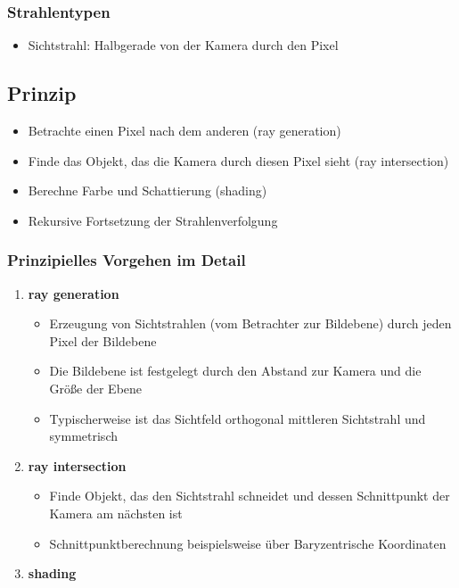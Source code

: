 \subsubsection{Strahlentypen}
\begin{itemize}
	\item Sichtstrahl: Halbgerade von der Kamera durch den Pixel
\end{itemize}


\subsection{Prinzip}
\begin{itemize}
	\item Betrachte einen Pixel nach dem anderen (ray generation)
	\item Finde das Objekt, das die Kamera durch diesen Pixel sieht (ray intersection)
	\item Berechne Farbe und Schattierung (shading)
	\item Rekursive Fortsetzung der Strahlenverfolgung
\end{itemize}

\subsubsection{Prinzipielles Vorgehen im Detail}
\begin{enumerate}
	\item \textbf{ray generation}
	\begin{itemize}
		\item Erzeugung von Sichtstrahlen (vom Betrachter zur Bildebene) durch jeden Pixel der Bildebene
		\item Die Bildebene ist festgelegt durch den Abstand zur Kamera und die Größe der Ebene
		\item Typischerweise ist das Sichtfeld orthogonal mittleren Sichtstrahl und symmetrisch 
	\end{itemize}
	\item \textbf{ray intersection}
	\begin{itemize}
		\item Finde Objekt, das den Sichtstrahl schneidet und dessen Schnittpunkt der Kamera am nächsten ist
		\item Schnittpunktberechnung beispielsweise über Baryzentrische Koordinaten
	\end{itemize}
	\item \textbf{shading}
\end{enumerate}


